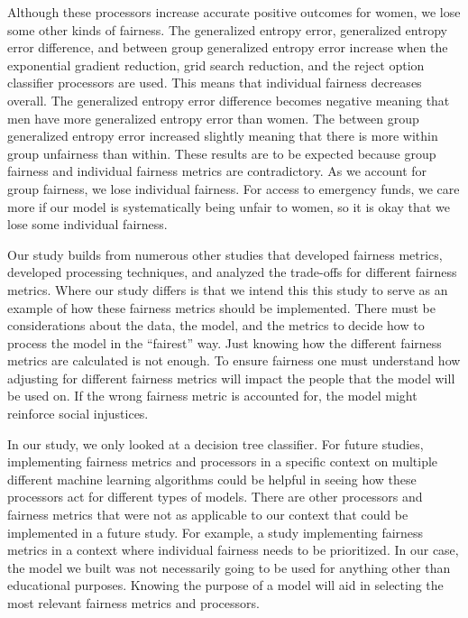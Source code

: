 \documentclass[water,article,submit,moreauthors,pdftex]{mdpi}
\begin{document}
Although these processors increase accurate positive outcomes for women,
we lose some other kinds of fairness. The generalized entropy error,
generalized entropy error difference, and between group generalized
entropy error increase when the exponential gradient reduction, grid
search reduction, and the reject option classifier processors are used.
This means that individual fairness decreases overall. The generalized
entropy error difference becomes negative meaning that men have more
generalized entropy error than women. The between group generalized
entropy error increased slightly meaning that there is more within group
unfairness than within. These results are to be expected because group
fairness and individual fairness metrics are contradictory. As we
account for group fairness, we lose individual fairness. For access to
emergency funds, we care more if our model is systematically being
unfair to women, so it is okay that we lose some individual fairness.

Our study builds from numerous other studies that developed fairness
metrics\citep{speicher2018unified, wachter2021fairness}, developed
processing
techniques\citep{agarwal2018reductions, kamiran2012data, agarwal2019fair, pleiss2017fairness},
and analyzed the trade-offs for different fairness
metrics\citep{speicher2018unified}. Where our study differs is that we
intend this this study to serve as an example of how these fairness
metrics should be implemented. There must be considerations about the
data, the model, and the metrics to decide how to process the model in
the ``fairest'' way. Just knowing how the different fairness metrics are
calculated is not enough. To ensure fairness one must understand how
adjusting for different fairness metrics will impact the people that the
model will be used on. If the wrong fairness metric is accounted for,
the model might reinforce social injustices.

In our study, we only looked at a decision tree classifier. For future
studies, implementing fairness metrics and processors in a specific
context on multiple different machine learning algorithms could be
helpful in seeing how these processors act for different types of
models. There are other processors and fairness metrics that were not as
applicable to our context that could be implemented in a future study.
For example, a study implementing fairness metrics in a context where
individual fairness needs to be prioritized. In our case, the model we
built was not necessarily going to be used for anything other than
educational purposes. Knowing the purpose of a model will aid in
selecting the most relevant fairness metrics and processors.
\end{document}

